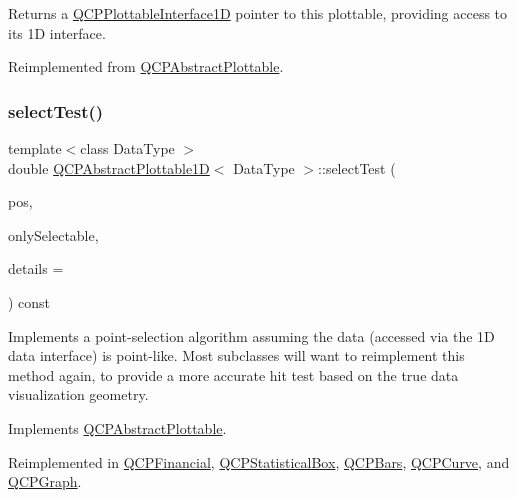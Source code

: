 Returns a \hyperlink{class_q_c_p_plottable_interface1_d}{Q\+C\+P\+Plottable\+Interface1D} pointer to this plottable, providing access to its 1D interface.

Reimplemented from \hyperlink{class_q_c_p_abstract_plottable_a81fd9fd5c4f429c074785e2eb238a8e7}{Q\+C\+P\+Abstract\+Plottable}.

\mbox{\label{class_q_c_p_abstract_plottable1_d_a4611b43bcb6441b2154eb4f4e0a33db2}} 
\subsubsection{\texorpdfstring{select\+Test()}{selectTest()}}
{\footnotesize\ttfamily template$<$class Data\+Type $>$ \\
double \hyperlink{class_q_c_p_abstract_plottable1_d}{Q\+C\+P\+Abstract\+Plottable1D}$<$ Data\+Type $>$\+::select\+Test (\begin{DoxyParamCaption}\item[{const Q\+PointF \&}]{pos,  }\item[{bool}]{only\+Selectable,  }\item[{Q\+Variant $\ast$}]{details = {} }\end{DoxyParamCaption}) const\hspace{0.3cm}{\ttfamily [virtual]}}

Implements a point-\/selection algorithm assuming the data (accessed via the 1D data interface) is point-\/like. Most subclasses will want to reimplement this method again, to provide a more accurate hit test based on the true data visualization geometry.

Implements \hyperlink{class_q_c_p_abstract_plottable_a38efe9641d972992a3d44204bc80ec1d}{Q\+C\+P\+Abstract\+Plottable}.



Reimplemented in \hyperlink{class_q_c_p_financial_aac8e91622ac58330fa9ce81cc8fd40ee}{Q\+C\+P\+Financial}, \hyperlink{class_q_c_p_statistical_box_a1607fa92f829c631107c20ccb2d70a6d}{Q\+C\+P\+Statistical\+Box}, \hyperlink{class_q_c_p_bars_a121f899c27af3186fe93dcd0eb98f49b}{Q\+C\+P\+Bars}, \hyperlink{class_q_c_p_curve_a0ed9b7e6b4bc72010d6fcd974af46a8b}{Q\+C\+P\+Curve}, and \hyperlink{class_q_c_p_graph_a6d669d04462d272c6aa0e5f85846d673}{Q\+C\+P\+Graph}.

